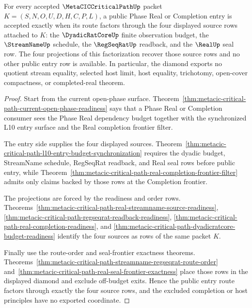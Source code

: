 \begin{theorem}
\label{thm:metacic-critical-path-phase-real-dependency-diamond}
For every accepted $\MetaCICCriticalPathUp$ packet $K=(S,N,O,U,D,H,C,P,L)$, a public Phase Real or Completion entry is accepted exactly when its route factors through the four displayed source rows attached to $K$: the $\DyadicRatCoreUp$ finite observation budget, the $\StreamNameUp$ schedule, the $\RegSeqRatUp$ readback, and the $\RealUp$ seal row. The four projections of this factorization recover those source rows and no other public entry row is available. In particular, the diamond exports no quotient stream equality, selected host limit, host equality, trichotomy, open-cover compactness, or completed-real theorem.
\end{theorem}
\begin{proof}
Start from the current open-phase surface. Theorem~\ref{thm:metacic-critical-path-current-open-phase-readiness} says that a Phase Real or Completion consumer sees the Phase Real dependency budget together with the synchronized L10 entry surface and the Real completion frontier filter.

The entry side supplies the four displayed sources. Theorem~\ref{thm:metacic-critical-path-l10-entry-budget-synchronization} requires the dyadic budget, StreamName schedule, RegSeqRat readback, and Real seal rows before public entry, while Theorem~\ref{thm:metacic-critical-path-real-completion-frontier-filter} admits only claims backed by those rows at the Completion frontier.

The projections are forced by the readiness and order rows. Theorems~\ref{thm:metacic-critical-path-real-streamname-source-readiness}, \ref{thm:metacic-critical-path-regseqrat-readback-readiness}, \ref{thm:metacic-critical-path-real-completion-readiness}, and \ref{thm:metacic-critical-path-dyadicratcore-budget-readiness} identify the four sources as rows of the same packet $K$.

Finally use the route-order and seal-frontier exactness theorems. Theorems~\ref{thm:metacic-critical-path-streamname-regseqrat-route-order} and~\ref{thm:metacic-critical-path-real-seal-frontier-exactness} place those rows in the displayed diamond and exclude off-budget exits. Hence the public entry route factors through exactly the four source rows, and the excluded completion or host principles have no exported coordinate.
\end{proof}

